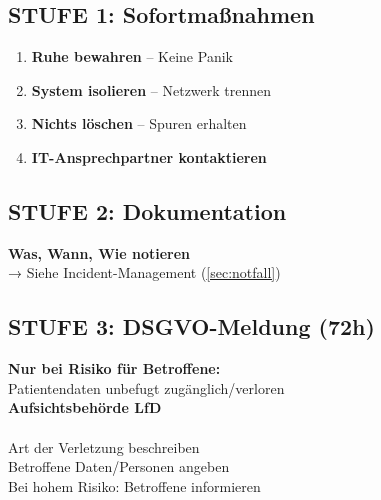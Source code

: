   \begin{minipage}[t]{0.48\textwidth}

    \subsection*{STUFE 1: Sofortmaßnahmen}
    \begin{enumerate}
      \item \textbf{Ruhe bewahren} – Keine Panik
      \item \textbf{System isolieren} – Netzwerk trennen
      \item \textbf{Nichts löschen} – Spuren erhalten
      \item \textbf{IT-Ansprechpartner kontaktieren}
    \end{enumerate}

    \subsection*{STUFE 2: Dokumentation}
    \textbf{Was, Wann, Wie notieren}\\
    → Siehe Incident-Management (\cref{sec:notfall})

    \subsection*{STUFE 3: DSGVO-Meldung (72h)}
    \textbf{Nur bei Risiko für Betroffene:}\\
    Patientendaten unbefugt zugänglich/verloren\\[0.2cm]
    \textbf{Aufsichtsbehörde LfD}\\
    \DatenschutzbehoerdeAdresse\\
    \BoxEmpty{} Art der Verletzung beschreiben\\
    \BoxEmpty{} Betroffene Daten/Personen angeben\\
    \BoxEmpty{} Bei hohem Risiko: Betroffene informieren

  \end{minipage}
  \hfill
